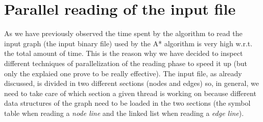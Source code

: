 \documentclass[twocolumn, switch]{article} %
\begin{document}
\section{Parallel reading of the input file}
As we have previously observed the time spent by the algorithm to read the input graph
(the input binary file) used by the A* algorithm is very high w.r.t. the total
amount of time. This is the reason why we have decided to inspect different techniques of
parallelization of the reading phase to speed it up (but only the explaied one prove
to be really effective). The input file, as already discussed,
is divided in two different sections (nodes and edges) so, in general, we need to take care of which
section a given thread is working on because different data structures of the graph need to
be loaded in the two sections (the symbol table when reading a \textit{node line} and the linked list when
reading a \textit{edge line}).
\end{document}
